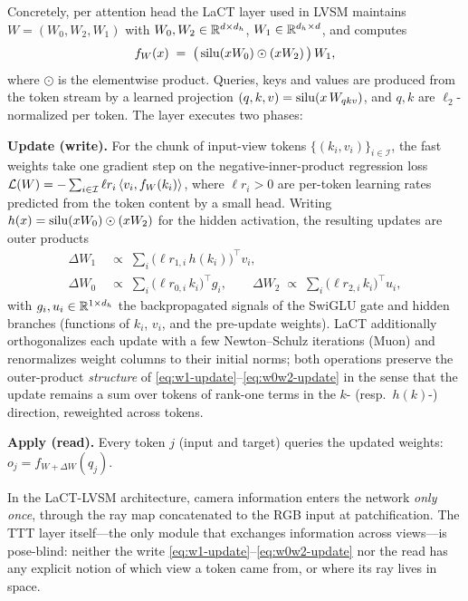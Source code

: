 Concretely, per attention head the LaCT layer used in LVSM maintains
$W = (W_0, W_2, W_1)$ with $W_0, W_2 \in \mathbb{R}^{d \times d_h}$,
$W_1 \in \mathbb{R}^{d_h \times d}$, and computes
\begin{equation}
\label{eq:swiglu-fw}
f_W(x) \;=\; \big(\, \mathrm{silu}(x W_0) \odot (x W_2) \,\big)\, W_1 ,
\end{equation}
where $\odot$ is the elementwise product. Queries, keys and values are
produced from the token stream by a learned projection
$(q, k, v) = \mathrm{silu}(x\, W_{qkv})$, and $q, k$ are $\ell_2$-normalized per
token. The layer executes two phases:

\textbf{Update (write).} For the chunk of input-view tokens
$\{(k_i, v_i)\}_{i \in \mathcal{I}}$, the fast weights take one gradient
step on the negative-inner-product regression loss
$\mathcal{L}(W) = -\sum_{i \in \mathcal{I}} \ell r_i \left\langle v_i, f_W(k_i) \right\rangle$,
where $\ell r_i > 0$ are per-token learning rates predicted from the token
content by a small head. Writing $h(x) = \mathrm{silu}(x W_0) \odot (x W_2)$ for
the hidden activation, the resulting updates are outer products
\begin{align}
\Delta W_1 &\;\propto\; \textstyle\sum_{i} \big(\ell r_{1,i}\, h(k_i)\big)^{\!\top} v_i,
\label{eq:w1-update}\\
\Delta W_0 &\;\propto\; \textstyle\sum_{i} \big(\ell r_{0,i}\, k_i\big)^{\!\top} g_i,
\qquad
\Delta W_2 \;\propto\; \textstyle\sum_{i} \big(\ell r_{2,i}\, k_i\big)^{\!\top} u_i,
\label{eq:w0w2-update}
\end{align}
with $g_i, u_i \in \mathbb{R}^{1 \times d_h}$ the backpropagated signals of the
SwiGLU gate and hidden branches (functions of $k_i$, $v_i$, and the
pre-update weights). LaCT additionally orthogonalizes each update with a
few Newton--Schulz iterations (Muon) and renormalizes
weight columns to their initial norms; both operations preserve the
outer-product \emph{structure} of \eqref{eq:w1-update}--\eqref{eq:w0w2-update}
in the sense that the update remains a sum over tokens of rank-one terms in
the $k$- (resp.\ $h(k)$-) direction, reweighted across tokens.

\textbf{Apply (read).} Every token $j$ (input and target) queries the
updated weights: $o_j = f_{W + \Delta W}(q_j)$.

In the LaCT-LVSM architecture, camera information enters the network
\emph{only once}, through the ray map concatenated to the RGB input at
patchification. The TTT layer itself---the only module that exchanges
information across views---is pose-blind: neither the write
\eqref{eq:w1-update}--\eqref{eq:w0w2-update} nor the read has any explicit
notion of which view a token came from, or where its ray lives in space.

